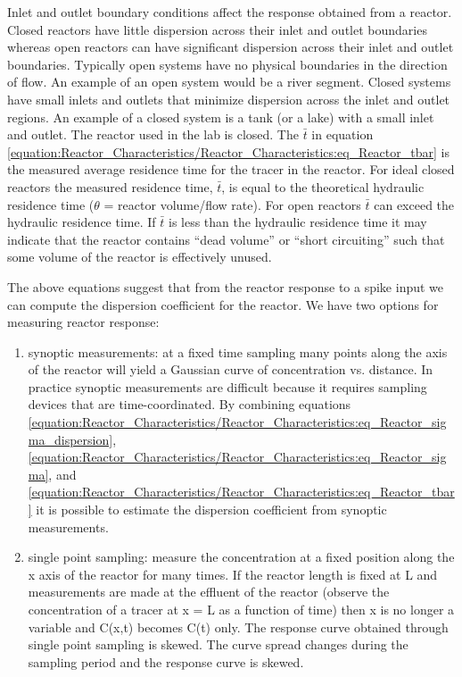 \documentclass[letterpaper,10pt,english]{sphinxmanual}
\begin{document}
Inlet and outlet boundary conditions affect the response obtained from a reactor. Closed reactors have little dispersion across their inlet and outlet boundaries whereas open reactors can have significant dispersion across their inlet and outlet boundaries. Typically open systems have no physical boundaries in the direction of flow. An example of an open system would be a river segment. Closed systems have small inlets and outlets that minimize dispersion across the inlet and outlet regions. An example of a closed system is a tank (or a lake) with a small inlet and outlet. The reactor used in the lab is closed. The \(\bar{t}\) in equation \eqref{equation:Reactor_Characteristics/Reactor_Characteristics:eq_Reactor_tbar} is the measured average residence time for the tracer in the reactor. For ideal closed reactors the measured residence time, \(\bar{t}\), is equal to the theoretical hydraulic residence time (\(\theta\) = reactor volume/flow rate). For open reactors \(\bar{t}\) can exceed the hydraulic residence time. If \(\bar{t}\) is less than the hydraulic residence time it may indicate that the reactor contains “dead volume” or “short circuiting” such that some volume of the reactor is effectively unused.

The above equations suggest that from the reactor response to a spike input we can compute the dispersion coefficient for the reactor. We have two options for measuring reactor response:
\begin{enumerate}
\item {} 
synoptic measurements: at a fixed time sampling many points along the axis of the reactor will yield a Gaussian curve of concentration vs. distance. In practice synoptic measurements are difficult because it requires sampling devices that are time-coordinated. By combining equations \eqref{equation:Reactor_Characteristics/Reactor_Characteristics:eq_Reactor_sigma_dispersion}, \eqref{equation:Reactor_Characteristics/Reactor_Characteristics:eq_Reactor_sigma}, and \eqref{equation:Reactor_Characteristics/Reactor_Characteristics:eq_Reactor_tbar} it is possible to estimate the dispersion coefficient from synoptic measurements.

\item {} 
single point sampling: measure the concentration at a fixed position along the x axis of the reactor for many times. If the reactor length is fixed at L and measurements are made at the effluent of the reactor (observe the concentration of a tracer at x = L as a function of time) then x is no longer a variable and C(x,t) becomes C(t) only. The response curve obtained through single point sampling is skewed. The curve spread changes during the sampling period and the response curve is skewed.

\end{enumerate}
\end{document}
